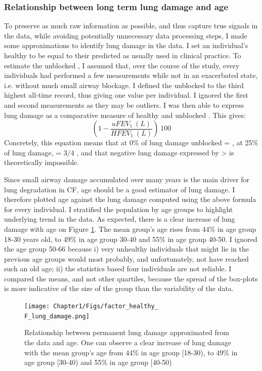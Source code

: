 \subsubsection{Relationship between long term lung damage and age}
To preserve as much raw information as possible, and thus capture true signals in the data, while avoiding potentially unnecessary data processing steps, I made some approximations to identify lung damage in the data. I set an individual's healthy \F to be equal to their predicted \F as usually used in clinical practice. To estimate the unblocked \F, I assumed that, over the course of the study, every individuals had performed a few \F measurements while not in an exacerbated state, i.e. without much small airway blockage. I defined the unblocked \F to the third highest all-time \F record, thus giving one value per individual. I ignored the first and second measurements as they may be outliers. I was then able to express lung damage as a comparative measure of healthy and unblocked \F. This gives:
\begin{equation}
    (1 - \frac{uF\!EV_1\ (L)}{H\!F\!EV_1\ (L)})\ 100
\end{equation}
Concretely, this equation means that at 0\% of lung damage unblocked \UF = \HF, at 25\% of lung damage, \UF = $3/4$ \HF, and that negative lung damage expressed by \UF > \HF is theoretically impossible.

Since small airway damage accumulated over many years is the main driver for lung degradation in CF, age should be a good estimator of lung damage. I therefore plotted age against the lung damage computed using the above formula for every individual. I stratified the population by age groups to highlight underlying trend in the data. As expected, there is a clear increase of lung damage with age on Figure \ref{fig:factor_\F_lung_damage}. The mean group's age rises from 44\% in age group 18-30 years old, to 49\% in age group 30-40 and 55\% in age group 40-50. I ignored the age group 50-66 because i) very unhealthy individuals that might lie in the previous age groups would most probably, and unfortunately, not have reached such an old age; ii) the statistics based four individuals are not reliable. I compared the means, and not other quartiles, because the spread of the box-plots is more indicative of the size of the group than the variability of the data.

\begin{figure}[!h]
    \caption{Relationship between permanent lung damage approximated from the data and age.  One can observe a clear increase of lung damage with the mean group's age from 44\% in age group [18-30), to 49\% in age group [30-40) and 55\% in age group [40-50)}
    \centering
    \texttt{[image: Chapter1/Figs/factor\_healthy\_\\F\_lung\_damage.png]}
    \label{fig:factor_\F_lung_damage}
\end{figure}

